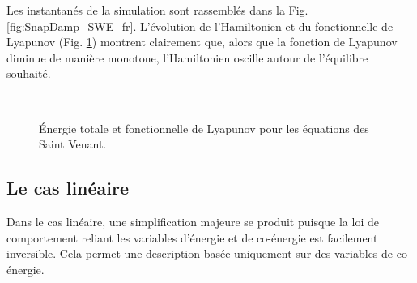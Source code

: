 Les instantanés de la simulation sont rassemblés dans la Fig. \ref{fig:SnapDamp_SWE_fr}. L'évolution de l'Hamiltonien et du fonctionnelle de Lyapunov  (Fig. \ref{fig:HL_SWE_fr}) montrent clairement que, alors que la fonction de Lyapunov diminue de manière monotone, l'Hamiltonien oscille autour de l'équilibre souhaité.

\begin{figure}[htb]%
	\centering
	\hspace{8pt}%
	 \\
	\caption{Énergie totale et fonctionnelle de Lyapunov pour les équations des Saint Venant.}%
	\label{fig:HL_SWE_fr}%
\end{figure}


\begin{figure*}[p]
	\centering
	\hfil
	\hfil
	\hfil
	\hfil
	\caption{Instantanés à différents moments de la simulation pour les équations irrotationnelles de Saint Venant contrôlées à la frontière.}
	\label{fig:SnapDamp_SWE_fr}
	\hfil
\end{figure*}


\subsection*{Le cas linéaire}
Dans le cas linéaire, une simplification majeure se produit puisque la loi de comportement reliant les variables d'énergie et de co-énergie est facilement inversible. Cela permet une description basée uniquement sur des variables de co-énergie. \\


